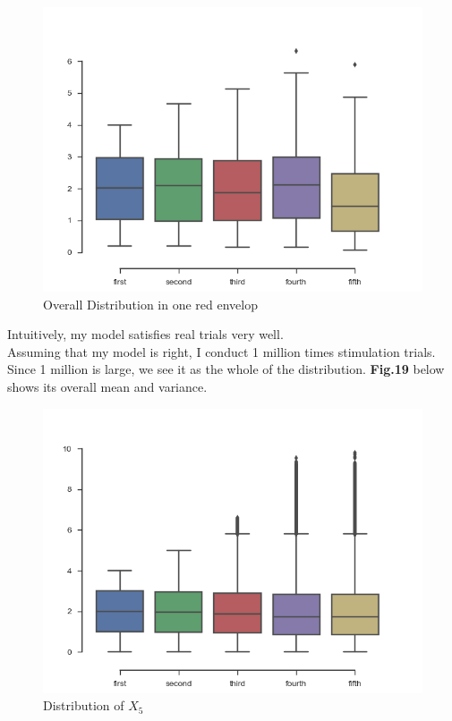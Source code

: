 \documentclass[10pt,journal]{IEEEtran}
\begin{document}
\begin{figure}[!ht]
	\centering
	\includegraphics[width=0.7\columnwidth,height=0.6\linewidth]{Posterior.png}
	\caption{Overall Distribution in one red envelop}
\end{figure}
\pagebreak
Intuitively, my model satisfies real trials very well.
\\
Assuming that my model is right, I conduct 1 million times stimulation trials. Since 1 million is large, we see it as the whole of the distribution. \textbf{Fig.19} below shows its overall mean and variance.
\\
\begin{figure}[!ht]
	\centering
	\includegraphics[width=0.7\columnwidth,height=0.8\linewidth]{Stimulation.png}
	\caption{Distribution of \(X_5\)}
\end{figure}
\end{document}
